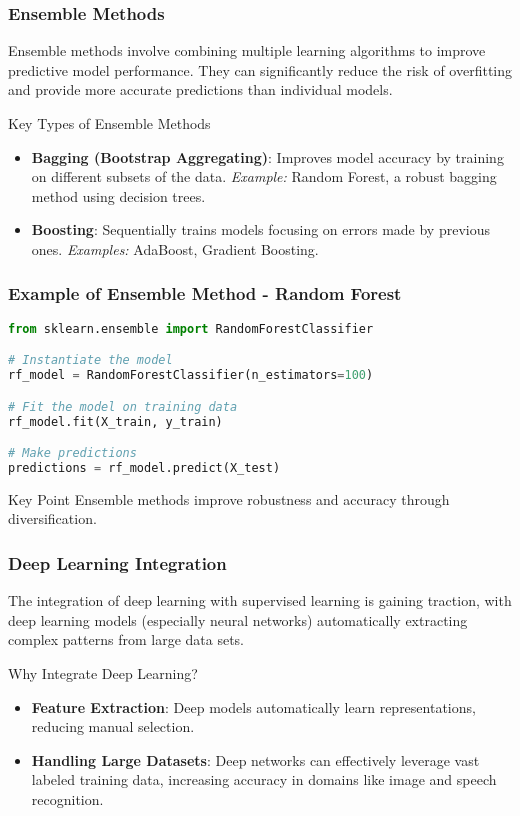 \documentclass[aspectratio=169]{beamer}
\begin{document}
\begin{frame}[fragile]
    \frametitle{Ensemble Methods}
    Ensemble methods involve combining multiple learning algorithms to improve predictive model performance. 
    They can significantly reduce the risk of overfitting and provide more accurate predictions than individual models.
    
    \begin{block}{Key Types of Ensemble Methods}
        \begin{itemize}
            \item \textbf{Bagging (Bootstrap Aggregating)}: 
                Improves model accuracy by training on different subsets of the data.
                \textit{Example:} Random Forest, a robust bagging method using decision trees.
            \item \textbf{Boosting}: 
                Sequentially trains models focusing on errors made by previous ones.
                \textit{Examples:} AdaBoost, Gradient Boosting.
        \end{itemize}
    \end{block}
\end{frame}

\begin{frame}[fragile]
    \frametitle{Example of Ensemble Method - Random Forest}
    \begin{lstlisting}[language=Python]
from sklearn.ensemble import RandomForestClassifier

# Instantiate the model
rf_model = RandomForestClassifier(n_estimators=100)

# Fit the model on training data
rf_model.fit(X_train, y_train)

# Make predictions
predictions = rf_model.predict(X_test)
    \end{lstlisting}

    \begin{block}{Key Point}
        Ensemble methods improve robustness and accuracy through diversification.
    \end{block}
\end{frame}

\begin{frame}
    \frametitle{Deep Learning Integration}
    The integration of deep learning with supervised learning is gaining traction, 
    with deep learning models (especially neural networks) automatically extracting complex patterns from large data sets.
    
    \begin{block}{Why Integrate Deep Learning?}
        \begin{itemize}
            \item \textbf{Feature Extraction}: 
                Deep models automatically learn representations, reducing manual selection.
            \item \textbf{Handling Large Datasets}: 
                Deep networks can effectively leverage vast labeled training data, increasing accuracy in domains like image and speech recognition.
        \end{itemize}
    \end{block}
\end{frame}
\end{document}
